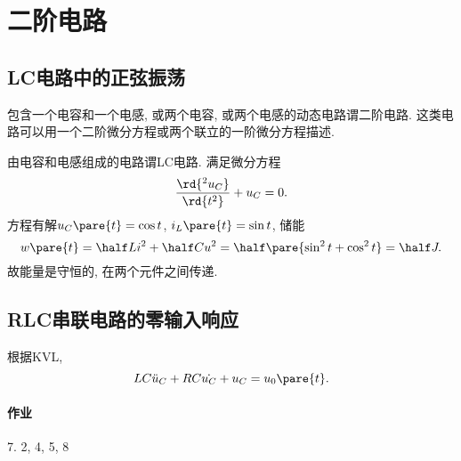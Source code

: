 \documentclass{ctexart}
\begin{document}
\section{二阶电路} %
\label{sec:二阶电路}

\subsection{LC电路中的正弦振荡} %
\label{sub:lc电路中的正弦振荡}

包含一个电容和一个电感, 或两个电容, 或两个电感的动态电路谓二阶电路. 这类电路可以用一个二阶微分方程或两个联立的一阶微分方程描述.
\par
由电容和电感组成的电路谓LC电路. 满足微分方程
\[ \frac{\rd{^2 u_C}}{\rd{t^2}} + u_C = 0. \]
方程有解$u_C\pare{t} = \cos{t}$, $i_L\pare{t} = \sin t$, 储能
\[ w\pare{t} = \half Li^2 + \half Cu^2 = \half \pare{\sin^2 t + \cos^2 t} = \half J. \]
故能量是守恒的, 在两个元件之间传递.


\subsection{RLC串联电路的零输入响应} %
\label{sub:rlc串联电路的零输入响应}
根据KVL,
\[ LC\ddot{u}_C + RC\dot{u_C} + u_C = u_0\pare{t}. \]


\paragraph{作业} %
\label{par:作业}

7. 2, 4, 5, 8


\end{document}

